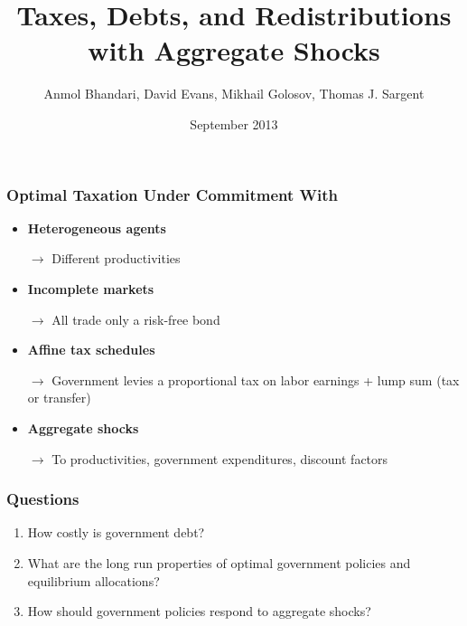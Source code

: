 \documentclass{beamer}
\title {Taxes, Debts,  and Redistributions with Aggregate Shocks}
\author{Anmol Bhandari, David Evans, Mikhail Golosov, Thomas J. Sargent}
\date{September 2013}
\begin{document}
%
\begin{frame}
\titlepage

\end{frame}

\begin{frame}
\frametitle{Optimal Taxation Under Commitment With}

\begin{itemize}
 \item \textbf{Heterogeneous agents}

 \quad \color{red}$\rightarrow$ \color{black} Different productivities

 \item \textbf{Incomplete markets}

 \quad \color{red}$\rightarrow$ \color{black}All trade only a risk-free bond

 \item \textbf{Affine tax schedules}

 \quad \color{red}$\rightarrow$ \color{black}Government levies a proportional tax on labor earnings + lump sum (tax or transfer)

 \item \textbf{Aggregate shocks}

 \quad \color{red}$\rightarrow$ \color{black} To productivities, government expenditures, discount factors

 \end{itemize}
\end{frame}


\begin{frame}
\frametitle{Questions}

\begin{enumerate}
 \item How costly is government debt?
 \item What are the long run properties of optimal government policies and equilibrium allocations?
\item How should government policies respond to aggregate shocks?
\end{enumerate}

\end{frame}
\end{document}
